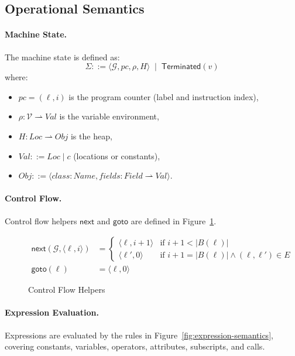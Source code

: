 \subsection{Operational Semantics}

\paragraph{Machine State.}
The machine state is defined as:
\[
\Sigma ::= \langle \mathcal{G}, pc, \rho, H \rangle \;\mid\; \mathsf{Terminated}(v)
\]
where:
\begin{itemize}
\item $pc = (\ell,i)$ is the program counter (label and instruction index),
\item $\rho : \mathcal{V} \rightharpoonup Val$ is the variable environment,
\item $H : Loc \rightharpoonup Obj$ is the heap,
\item $Val ::= Loc \mid c$ (locations or constants),
\item $Obj ::= \langle class:Name, fields: Field \rightharpoonup Val \rangle$.
\end{itemize}

\paragraph{Control Flow.}
Control flow helpers $\mathsf{next}$ and $\mathsf{goto}$ are defined in Figure~\ref{fig:control-flow-helpers}.

\begin{figure}[ht]
\centering
\[
\begin{aligned}
\mathsf{next}(\mathcal{G}, \langle \ell,i \rangle) &=
\begin{cases}
\langle \ell,i+1 \rangle & \text{if } i+1 < |B(\ell)| \\
\langle \ell',0 \rangle & \text{if } i+1=|B(\ell)| \land (\ell,\ell')\in E
\end{cases} \\
\mathsf{goto}(\ell) &= \langle \ell,0 \rangle
\end{aligned}
\]
\caption{Control Flow Helpers}
\label{fig:control-flow-helpers}
\end{figure}

\paragraph{Expression Evaluation.}
Expressions are evaluated by the rules in Figure~\ref{fig:expression-semantics}, covering constants, variables, operators, attributes, subscripts, and calls.

